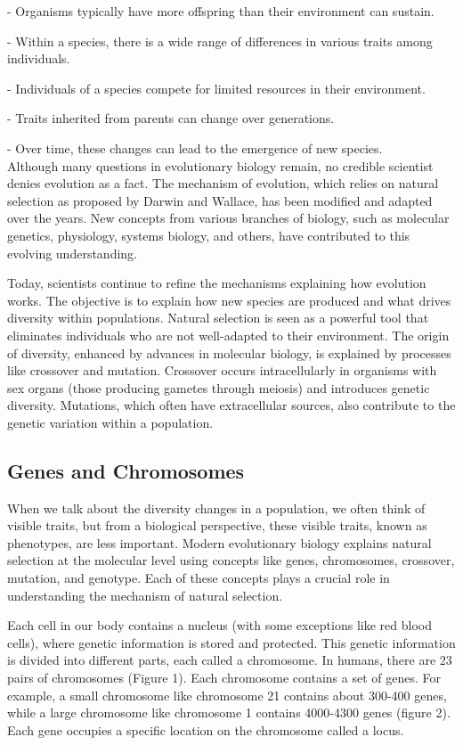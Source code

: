 \documentclass[12pt]{article}
\begin{document}
    - Organisms typically have more offspring than their environment can sustain.

    - Within a species, there is a wide range of differences in various traits among individuals.

    - Individuals of a species compete for limited resources in their environment.

    - Traits inherited from parents can change over generations.

    - Over time, these changes can lead to the emergence of new species.\\[5px]

Although many questions in evolutionary biology remain, no credible scientist denies evolution as a fact. The mechanism of evolution, which relies on natural selection as proposed by Darwin and Wallace, has been modified and adapted over the years. New concepts from various branches of biology, such as molecular genetics, physiology, systems biology, and others, have contributed to this evolving understanding.

Today, scientists continue to refine the mechanisms explaining how evolution works. The objective is to explain how new species are produced and what drives diversity within populations. Natural selection is seen as a powerful tool that eliminates individuals who are not well-adapted to their environment. The origin of diversity, enhanced by advances in molecular biology, is explained by processes like crossover and mutation. Crossover occurs intracellularly in organisms with sex organs (those producing gametes through meiosis) and introduces genetic diversity. Mutations, which often have extracellular sources, also contribute to the genetic variation within a population.

\subsection{Genes and Chromosomes}

When we talk about the diversity changes in a population, we often think of visible traits, but from a biological perspective, these visible traits, known as phenotypes, are less important. Modern evolutionary biology explains natural selection at the molecular level using concepts like genes, chromosomes, crossover, mutation, and genotype. Each of these concepts plays a crucial role in understanding the mechanism of natural selection.

Each cell in our body contains a nucleus (with some exceptions like red blood cells), where genetic information is stored and protected. This genetic information is divided into different parts, each called a chromosome. In humans, there are 23 pairs of chromosomes (Figure 1). Each chromosome contains a set of genes. For example, a small chromosome like chromosome 21 contains about 300-400 genes, while a large chromosome like chromosome 1 contains 4000-4300 genes (figure 2). Each gene occupies a specific location on the chromosome called a locus.
\end{document}
